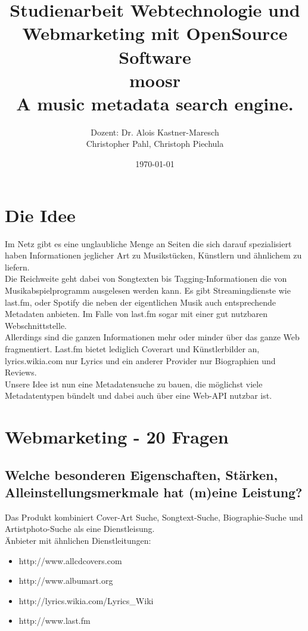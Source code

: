 \documentclass[11pt]{scrreprt}
\title{Studienarbeit Webtechnologie und Webmarketing mit OpenSource Software \\
    \textcolor{WildStrawberry}{\huge{moosr}} \\
    \normalsize{A music metadata search engine.}
}
\author{Dozent: Dr. Alois Kastner-Maresch\\
Christopher Pahl, Christoph Piechula}
\date{\today}
\begin{document}
\maketitle
\tableofcontents
\chapter{Die Idee}
Im Netz gibt es eine unglaubliche Menge an Seiten die sich darauf spezialisiert
haben Informationen jeglicher Art zu Musikstücken, Künstlern und ähnlichem zu
liefern.
\\
Die Reichweite geht dabei von Songtexten bis Tagging-Informationen die von
Musikabspielprogramm ausgelesen werden kann. Es gibt Streamingdienste wie last.fm,
oder Spotify die neben der eigentlichen Musik auch entsprechende Metadaten anbieten. 
Im Falle von last.fm sogar mit einer gut nutzbaren Webschnittstelle.
\\
Allerdings sind die ganzen Informationen mehr oder minder über das ganze Web
fragmentiert. Last.fm bietet lediglich Coverart und Künstlerbilder an, 
lyrics.wikia.com nur Lyrics und ein anderer Provider nur Biographien und
Reviews.
\\
Unsere Idee ist nun eine Metadatensuche zu bauen, die möglichst viele
Metadatentypen bündelt und dabei auch über eine Web-API nutzbar ist.

\chapter{Webmarketing - 20 Fragen}

\label{wettbewerb}\section{Welche besonderen Eigenschaften, Stärken,
Alleinstellungsmerkmale hat (m)eine Leistung?}

Das Produkt kombiniert Cover-Art Suche, Songtext-Suche, Biographie-Suche und
Artistphoto-Suche als eine Dienstleisung.
\\
Änbieter mit ähnlichen Dienstleitungen: \\

\begin{itemize}
    \item http://www.allcdcovers.com
    \item http://www.albumart.org
    \item http://lyrics.wikia.com/Lyrics\_Wiki
    \item http://www.last.fm
\end{itemize}
\end{document}
